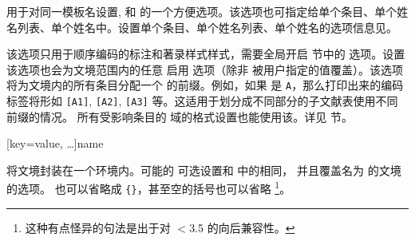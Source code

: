 \begin{ltxsyntax}
\begin{optionlist*}

用于对同一模板名设置,  和 的一个方便选项。该选项也可指定给单个条目、单个姓名列表、单个姓名中。设置单个条目、单个姓名列表、单个姓名的选项信息见。


该选项只用于顺序编码的标注和著录样式样式，需要全局开启  节中的  选项。设置该选项也会为文境范围内的任意  启用  选项（除非  被用户指定的值覆盖）。该选项将为文境内的所有条目分配一个  的前缀。例如，如果  是 \texttt{A}，那么打印出来的编码标签将形如 \texttt{[A1]}, \texttt{[A2]}, \texttt{[A3]} 等。这适用于划分成不同部分的子文献表使用不同前缀的情况。
所有受影响条目的  域的格式设置也能使用该。详见  节。

\end{optionlist*}
%

[key=value, \dots]{name}

将文境封装在一个环境内。可能的  可选设置和  中的相同，
并且覆盖名为  的文境的选项。 也可以省略成 \verb+{}+，甚至空的括号也可以省略
\footnote{这种有点怪异的句法是出于对 \biblatex $<$3.5 的向后兼容性。}。


\end{ltxsyntax}
